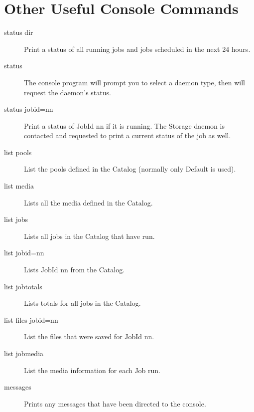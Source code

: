 \section{Other Useful Console Commands}

\begin{description}

\item [status dir]
   Print a status of all running jobs and jobs  scheduled in the next 24 hours.  

\item [status]
   The console program will prompt you to select  a daemon type, then will
request the daemon's status.  

\item [status jobid=nn]
   Print a status of JobId nn if it is running.  The Storage daemon is contacted
and requested to print a current  status of the job as well.  

\item [list pools]
   List the pools defined in the Catalog (normally  only Default is used).  

\item [list media]
   Lists all the media defined in the Catalog.  

\item [list jobs]
   Lists all jobs in the Catalog that have run.  

\item [list jobid=nn]
   Lists JobId nn from the Catalog.  

\item [list jobtotals]
   Lists totals for all jobs in the Catalog.  

\item [list files jobid=nn]
   List the files that were saved for JobId nn.  

\item [list jobmedia]
   List the media information for each Job run.  

\item [messages]
   Prints any messages that have been directed to the console.  


\end{description}
